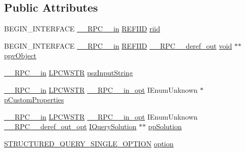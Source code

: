 \subsection*{Public Attributes}
\begin{DoxyCompactItemize}
\item 
B\+E\+G\+I\+N\+\_\+\+I\+N\+T\+E\+R\+F\+A\+CE \hyperlink{rpcsal_8h_a20b7f6da600a05c8b541659f14f7f0e6}{\+\_\+\+\_\+\+R\+P\+C\+\_\+\+\_\+in} \hyperlink{px__win__ds_8c_a80ec49c8ae61e234197d5071d2df497d}{R\+E\+F\+I\+ID} \hyperlink{struct_i_query_parser_vtbl_acf02375daea99e2ef4dbe5987e20307b}{riid}
\item 
B\+E\+G\+I\+N\+\_\+\+I\+N\+T\+E\+R\+F\+A\+CE \hyperlink{rpcsal_8h_a20b7f6da600a05c8b541659f14f7f0e6}{\+\_\+\+\_\+\+R\+P\+C\+\_\+\+\_\+in} \hyperlink{px__win__ds_8c_a80ec49c8ae61e234197d5071d2df497d}{R\+E\+F\+I\+ID} \hyperlink{rpcsal_8h_a23bc188526f10656f9c79d950f6c3192}{\+\_\+\+\_\+\+R\+P\+C\+\_\+\+\_\+deref\+\_\+out} \hyperlink{sound_8c_ae35f5844602719cf66324f4de2a658b3}{void} $\ast$$\ast$ \hyperlink{struct_i_query_parser_vtbl_a46c08c492ef827df69f894d73ac2fc4f}{ppv\+Object}
\item 
\hyperlink{rpcsal_8h_a20b7f6da600a05c8b541659f14f7f0e6}{\+\_\+\+\_\+\+R\+P\+C\+\_\+\+\_\+in} \hyperlink{mapinls_8h_a25fda90f83ded0efd5456a4e7eda1e0c}{L\+P\+C\+W\+S\+TR} \hyperlink{struct_i_query_parser_vtbl_aeb325457960fddf7cfde15840cdfe295}{psz\+Input\+String}
\item 
\hyperlink{rpcsal_8h_a20b7f6da600a05c8b541659f14f7f0e6}{\+\_\+\+\_\+\+R\+P\+C\+\_\+\+\_\+in} \hyperlink{mapinls_8h_a25fda90f83ded0efd5456a4e7eda1e0c}{L\+P\+C\+W\+S\+TR} \hyperlink{rpcsal_8h_a6e152ac84637d70f0453366759b3b9fb}{\+\_\+\+\_\+\+R\+P\+C\+\_\+\+\_\+in\+\_\+opt} I\+Enum\+Unknown $\ast$ \hyperlink{struct_i_query_parser_vtbl_a6cb966c92a08674b3184c6f97807c571}{p\+Custom\+Properties}
\item 
\hyperlink{rpcsal_8h_a20b7f6da600a05c8b541659f14f7f0e6}{\+\_\+\+\_\+\+R\+P\+C\+\_\+\+\_\+in} \hyperlink{mapinls_8h_a25fda90f83ded0efd5456a4e7eda1e0c}{L\+P\+C\+W\+S\+TR} \hyperlink{rpcsal_8h_a6e152ac84637d70f0453366759b3b9fb}{\+\_\+\+\_\+\+R\+P\+C\+\_\+\+\_\+in\+\_\+opt} I\+Enum\+Unknown \hyperlink{rpcsal_8h_ab29e89ceb0eb0b075c6f6299b0de6a21}{\+\_\+\+\_\+\+R\+P\+C\+\_\+\+\_\+deref\+\_\+out\+\_\+opt} \hyperlink{structuredquery_8h_a34bdc4e4bd6e4cc32567fef04b30b355}{I\+Query\+Solution} $\ast$$\ast$ \hyperlink{struct_i_query_parser_vtbl_ae0823488754101f09d55af482018e911}{pp\+Solution}
\item 
\hyperlink{structuredquery_8h_a73f48b8aca2af5f76caa86174af94553}{S\+T\+R\+U\+C\+T\+U\+R\+E\+D\+\_\+\+Q\+U\+E\+R\+Y\+\_\+\+S\+I\+N\+G\+L\+E\+\_\+\+O\+P\+T\+I\+ON} \hyperlink{struct_i_query_parser_vtbl_a216b0cb6c412f36d6d724c09eb8cb05b}{option}

\end{DoxyCompactItemize}
